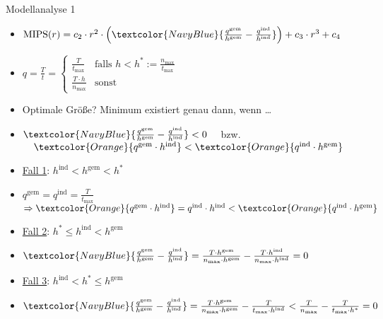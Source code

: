 \documentclass[beamer, xcolor={table,usenames,dvipsnames}]{beamer}
\newcommand{\cmark}{\ding{51}}%
\newcommand{\xmark}{\ding{55}}%
\newcommand{\markera}[1]{\textcolor{NavyBlue}{#1}} %
\newcommand{\markerb}[1]{\textcolor{Orange}{#1}} %
\begin{document}
    \begin{frame}{Modellanalyse 1}
    	\begin{itemize}
    		\item<1-> $\text{MIPS}(r) = c_2 \cdot r^2 \cdot \left(\markera{\frac{q^\text{gem}}{h^\text{gem}} - \frac{q^\text{ind}}{h^\text{ind}}} \right) + c_3 \cdot r^3 + c_4$
    		\item<2-> $q = \frac{T}{t} = \left\{ \begin{array}{ll}  \frac{T}{t_{\text{max}}} & \mbox{falls } h < h^*:= \frac{n_\text{max}}{t_\text{max}} \\[5pt] \frac{T \cdot h}{n_\text{max}} & \mbox{sonst} \end{array} \right.$
    		\item<3-> Optimale Größe? Minimum existiert genau dann, wenn \dots
	    		\item<4->[] $\markera{\frac{q^\text{gem}}{h^\text{gem}} - \frac{q^\text{ind}}{h^\text{ind}}} < 0 \quad$ bzw. $\quad \markerb{q^\text{gem} \cdot h^\text{ind}} < \markerb{q^\text{ind} \cdot h^\text{gem}}$
   			\item<5-> \underline{Fall 1}: $h^\text{ind}< h^\text{gem} < h^*$ \\
	 			\item<6->[] $q^\text{gem} = q^\text{ind} = \frac{T}{t_\text{max}}$
 			$\Rightarrow \markerb{q^\text{gem} \cdot h^\text{ind}} = q^\text{ind} \cdot h^\text{ind} < \markerb{q^\text{ind} \cdot h^\text{gem}}$ \cmark
   			\item<7-> \underline{Fall 2}: $h^* \leq h^\text{ind} < h^\text{gem}$
	    		\item<8->[] $\markera{\frac{q^\text{gem}}{h^\text{gem}} - \frac{q^\text{ind}}{h^\text{ind}}} = \frac{T \cdot h^\text{gem}}{n_\text{max} \cdot h^\text{gem}} - \frac{T \cdot h^\text{ind}}{n_\text{max} \cdot h^\text{ind}} = 0$ \xmark
   			\item<9-> \underline{Fall 3}: $h^\text{ind} < h^* \leq h^\text{gem}$
				 \item<10->[] $\markera{\frac{q^\text{gem}}{h^\text{gem}} - \frac{q^\text{ind}}{h^\text{ind}}} = \frac{T \cdot h^\text{gem}}{n_\text{max} \cdot h^\text{gem}} - \frac{T}{t_\text{max} \cdot h^\text{ind}} < \frac{T}{n_\text{max}} - \frac{T}{t_\text{max} \cdot h^*} = 0$ \cmark
    	\end{itemize}
    \end{frame}
    
\end{document}
